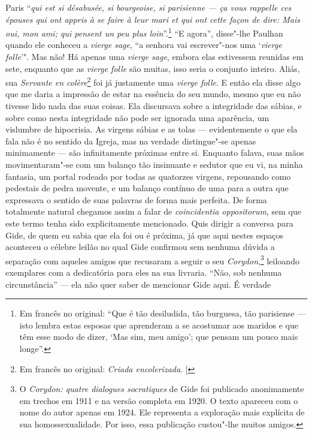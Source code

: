 Paris ``\emph{qui est si désabusée, si bourgeoise, si parisienne --- ça
vous rappelle ces épouses qui ont appris à se faire à leur mari et qui
ont cette façon de dire: Mais oui, mon ami; qui pensent un peu plus
loin}''.\footnote{Em francês no original: ``Que é tão desiludida, tão burguesa, tão
  parisiense --- isto lembra estas esposas que aprenderam a se acostumar
  aos maridos e que têm esse modo de dizer, `Mas sim, meu amigo'; que
  pensam um pouco mais longe''. \versal{[N.~T.]}} ``E agora'',
disse"-lhe Paulhan quando ele conheceu a \emph{vierge sage}, ``a senhora
vai escrever"-nos uma `\emph{vierge folle}'". Mas não! Há apenas uma
\emph{vierge sage}, embora elas estivessem reunidas em sete, enquanto
que as \emph{vierge folle} são muitas, isso seria o conjunto inteiro.
Aliás, sua \emph{Servante en colère}\footnote{Em francês no original: \emph{Criada encolerizada}. {[}\versal{N.~T.}{]}} foi já justamente uma \emph{vierge
folle}. E então ela disse algo que me daria a impressão de estar na
essência do seu mundo, mesmo que eu não tivesse lido nada das suas
coisas. Ela discursava sobre a integridade das sábias, e sobre como
nesta integridade não pode ser ignorada uma aparência, um vislumbre de
hipocrisia. As virgens sábias e as tolas --- evidentemente o que ela fala
não é no sentido da Igreja, mas na verdade distingue"-se apenas
minimamente --- são infinitamente próximas entre si. Enquanto falava,
suas mãos movimentaram"-se com um balanço tão insinuante e sedutor que eu
vi, na minha fantasia, um portal rodeado por todas as quatorzes virgens,
repousando como pedestais de pedra movente, e um balanço contínuo de uma
para a outra que expressava o sentido de suas palavras de forma mais
perfeita. De forma totalmente natural chegamos assim a falar de
\emph{coincidentia oppositorum}, sem que este termo tenha sido
explicitamente mencionado. Quis dirigir a conversa para Gide, de quem eu
sabia que ela foi ou é próxima, já que aqui nestes espaços aconteceu o
célebre leilão no qual Gide confirmou sem nenhuma dúvida a separação com
aqueles amigos que recusaram a seguir o seu \emph{Corydon},\footnote{O \emph{Corydon: quatre dialogues socratiques} de Gide foi publicado
  anonimamente em trechos em 1911 e na versão completa em 1920. O texto
  apareceu com o nome do autor apenas em 1924. Ele representa a
  exploração mais explícita de sua homossexualidade. Por isso, essa
  publicação custou"-lhe muitos amigos. \versal{[N.~O.]}} leiloando exemplares com a
dedicatória para eles na sua livraria. ``Não, sob nenhuma
circunstância'' --- ela não quer saber de mencionar Gide aqui. É verdade
